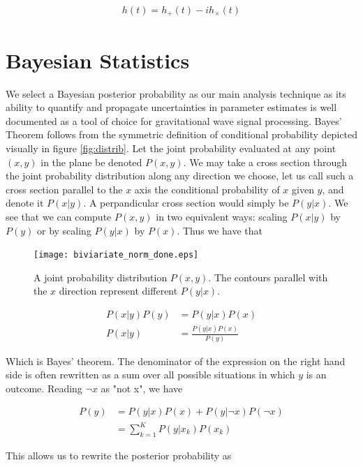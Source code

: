 \begin{align}
h(t) = h_+(t) - i h_{\times}(t)
\end{align}

\section{Bayesian Statistics}

We select a Bayesian posterior probability as our main analysis technique as its ability to quantify and propagate uncertainties in parameter estimates is well documented \cite{Volume-2} as a tool of choice for gravitational wave signal processing. Bayes' Theorem follows from the symmetric definition of conditional probability depicted visually in figure \ref{fig:distrib}. Let the joint probability evaluated at any point $(x,y)$ in the plane be denoted $P(x,y)$. We may take a cross section through the joint probability distribution along any direction we choose, let us call such a cross section parallel to the $x$ axis the conditional probability of $x$ given $y$, and denote it $P(x|y)$. A perpandicular cross section would simply be $P(y|x)$. We see that we can compute $P(x,y)$ in two equivalent ways: scaling $P(x|y)$ by $P(y)$ or by scaling $P(y|x)$ by $P(x)$. Thus we have that 


\begin{figure}[h!]
\center
\texttt{[image: biviariate\_norm\_done.eps]}
\caption{A joint probability distribution $P(x,y)$. The contours parallel with the $x$ direction represent different $P(y|x)$.}
\label{fig:sphere}
\end{figure}

\begin{align} \label{eq:bayes}
P(x|y)P(y) &= P(y|x)P(x) \\
P(x|y) &= \frac{P(y|x)P(x)}{P(y)}
\end{align}

Which is Bayes' theorem. The denominator of the expression on the right hand side is often rewritten as a sum over all possible situations in which $y$ is an outcome. Reading $\neg x$ as "not x", we have

\begin{align}\label{eq:continuous}
P(y) &= P(y|x)P(x) + P(y|\neg x)P(\neg x) \\
&= \sum_{k=1}^K P(y|x_k)P(x_k) 
\end{align}


\clearpage 
This allows us to rewrite the posterior probability as

